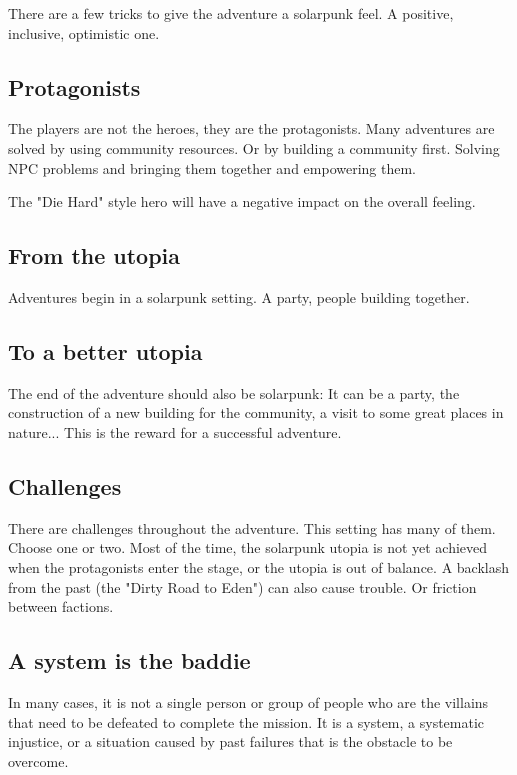 There are a few tricks to give the adventure a solarpunk feel. A positive, inclusive, optimistic one.

\subsection{Protagonists}

The players are not the heroes, they are the protagonists. Many adventures are solved by using community resources.
Or by building a community first. Solving NPC problems and bringing them together and empowering them.

The "Die Hard" style hero will have a negative impact on the overall feeling.

\subsection{From the utopia}

Adventures begin in a solarpunk setting. A party, people building together.

\subsection{To a better utopia}

The end of the adventure should also be solarpunk: It can be a party, the construction of a new building for the community, a visit to some great places in nature... This is the reward for a successful adventure.

\subsection{Challenges}

There are challenges throughout the adventure. This setting has many of them. Choose one or two. Most of the time, the solarpunk utopia is not yet achieved when the protagonists enter the stage, or the utopia is out of balance. A backlash from the past (the "Dirty Road to Eden") can also cause trouble. Or friction between factions.

\subsection{A system is the baddie}

In many cases, it is not a single person or group of people who are the villains that need to be defeated to complete the mission. It is a system, a systematic injustice, or a situation caused by past failures that is the obstacle to be overcome.


